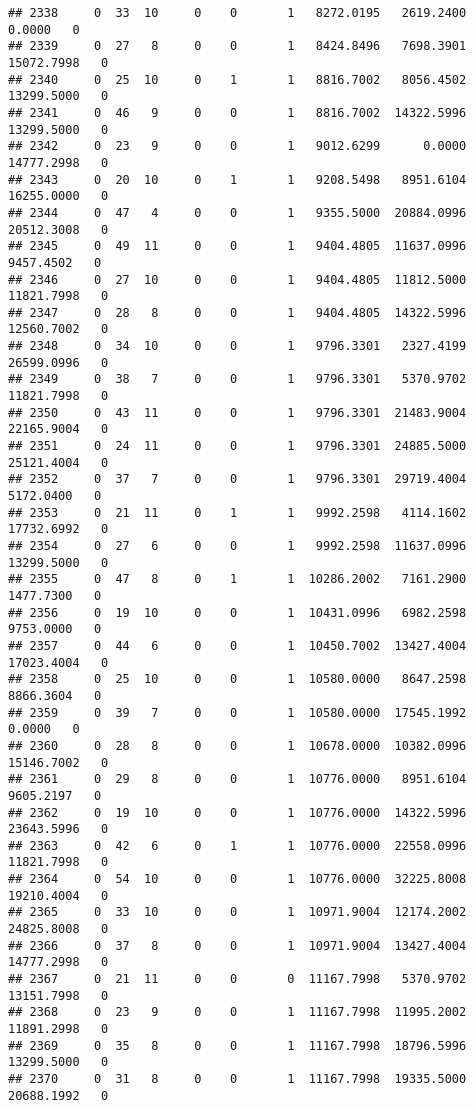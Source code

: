 \documentclass[
]{article}
\begin{document}
\begin{enumerate}
\begin{verbatim}
## 2338     0  33  10     0    0       1   8272.0195   2619.2400      0.0000   0
## 2339     0  27   8     0    0       1   8424.8496   7698.3901  15072.7998   0
## 2340     0  25  10     0    1       1   8816.7002   8056.4502  13299.5000   0
## 2341     0  46   9     0    0       1   8816.7002  14322.5996  13299.5000   0
## 2342     0  23   9     0    0       1   9012.6299      0.0000  14777.2998   0
## 2343     0  20  10     0    1       1   9208.5498   8951.6104  16255.0000   0
## 2344     0  47   4     0    0       1   9355.5000  20884.0996  20512.3008   0
## 2345     0  49  11     0    0       1   9404.4805  11637.0996   9457.4502   0
## 2346     0  27  10     0    0       1   9404.4805  11812.5000  11821.7998   0
## 2347     0  28   8     0    0       1   9404.4805  14322.5996  12560.7002   0
## 2348     0  34  10     0    0       1   9796.3301   2327.4199  26599.0996   0
## 2349     0  38   7     0    0       1   9796.3301   5370.9702  11821.7998   0
## 2350     0  43  11     0    0       1   9796.3301  21483.9004  22165.9004   0
## 2351     0  24  11     0    0       1   9796.3301  24885.5000  25121.4004   0
## 2352     0  37   7     0    0       1   9796.3301  29719.4004   5172.0400   0
## 2353     0  21  11     0    1       1   9992.2598   4114.1602  17732.6992   0
## 2354     0  27   6     0    0       1   9992.2598  11637.0996  13299.5000   0
## 2355     0  47   8     0    1       1  10286.2002   7161.2900   1477.7300   0
## 2356     0  19  10     0    0       1  10431.0996   6982.2598   9753.0000   0
## 2357     0  44   6     0    0       1  10450.7002  13427.4004  17023.4004   0
## 2358     0  25  10     0    0       1  10580.0000   8647.2598   8866.3604   0
## 2359     0  39   7     0    0       1  10580.0000  17545.1992      0.0000   0
## 2360     0  28   8     0    0       1  10678.0000  10382.0996  15146.7002   0
## 2361     0  29   8     0    0       1  10776.0000   8951.6104   9605.2197   0
## 2362     0  19  10     0    0       1  10776.0000  14322.5996  23643.5996   0
## 2363     0  42   6     0    1       1  10776.0000  22558.0996  11821.7998   0
## 2364     0  54  10     0    0       1  10776.0000  32225.8008  19210.4004   0
## 2365     0  33  10     0    0       1  10971.9004  12174.2002  24825.8008   0
## 2366     0  37   8     0    0       1  10971.9004  13427.4004  14777.2998   0
## 2367     0  21  11     0    0       0  11167.7998   5370.9702  13151.7998   0
## 2368     0  23   9     0    0       1  11167.7998  11995.2002  11891.2998   0
## 2369     0  35   8     0    0       1  11167.7998  18796.5996  13299.5000   0
## 2370     0  31   8     0    0       1  11167.7998  19335.5000  20688.1992   0

\end{verbatim}
\end{enumerate}
\end{document}
